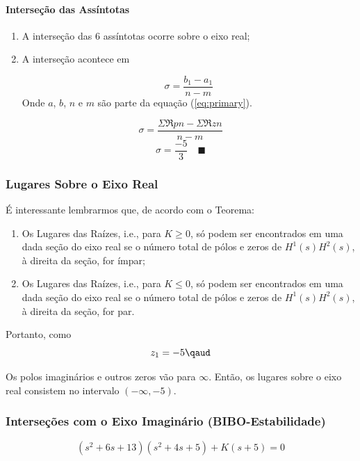 \documentclass[a4paper, 12pt]{article}
\begin{document}
\paragraph{Interseção das Assíntotas}

\begin{enumerate}
    \item A interseção das 6 assíntotas ocorre sobre o eixo real;
    \item A interseção acontece em
    
    \begin{equation}
    \sigma = \frac{b_{1}-a_{1}}{n-m}    
    \end{equation} 
    Onde $a$, $b$, $n$ e $m$ são parte da equação (\ref{eq:primary}).
\end{enumerate}

\begin{equation}
		\sigma = \frac{\Sigma \Re pn  - \Sigma \Re zn}{n-m}
\end{equation}\begin{equation}
	\sigma =\frac{-5}{3} \quad \blacksquare
\end{equation}



\subsubsection{Lugares Sobre o Eixo Real} 
É interessante lembrarmos que, de acordo com o Teorema:

\begin{enumerate}
    \item Os Lugares das Raízes, i.e., para $K \geq 0$, só podem ser encontrados em uma dada seção do eixo real se o número total de pólos e zeros de $H^1(s)H^2(s)$, à direita da seção, for ímpar;
    \item Os Lugares das Raízes, i.e., para $K \leq 0$, só podem ser encontrados em uma dada seção do eixo real se o número total de pólos e zeros de $H^1(s)H^2(s)$, à direita da seção, for par.
\end{enumerate}

Portanto, como 
\begin{equation}
   z_{1}=-5 \qaud
\end{equation}

Os polos imaginários e outros zeros vão para $\infty$. Então, os lugares sobre o eixo real consistem no intervalo $(-\infty, -5)$. \blacksquare

 
\subsubsection{Interseções com o Eixo Imaginário (BIBO-Estabilidade)} 
\begin{equation}\label{eq:primary}
   (s^2+6s+13)(s^2+4s+5)+K(s+5) = 0
\end{equation}
\end{document}

